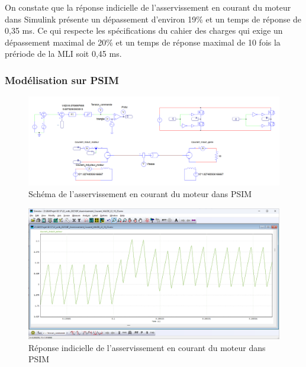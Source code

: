 On constate que la réponse indicielle de l'asservissement en courant du moteur dans Simulink présente un dépassement d'environ 19\% et un temps de réponse de 0,35 ms. Ce qui respecte les spécifications du cahier des charges qui exige un dépassement maximal de 20\% et un temps de réponse maximal de 10 fois la prériode de la MLI soit 0,45 ms.

\subsubsection{Modélisation sur PSIM}

\begin{figure}[H]
    \centering
    \includegraphics[width=1\textwidth]{images/boucle_de_courant/PSIM_boucle_de_courant.png}
    \caption{Schéma de l'asservissement en courant du moteur dans PSIM}
    \label{fig:asservissement_courant_psim}
\end{figure}
\begin{figure}[H]
    \centering
    \includegraphics[width=1\textwidth]{images/boucle_de_courant/PSIM reponse indicielle courant BF.png}
    \caption{Réponse indicielle de l'asservissement en courant du moteur dans PSIM}
    \label{fig:reponse_indicielle_courant_psim}
\end{figure}

